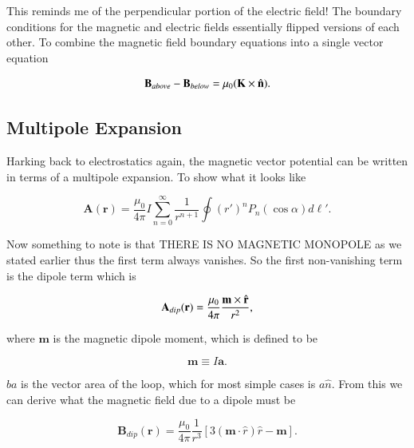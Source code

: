 \documentclass[preprint, review,12pt]{elsarticle}
\def\m{\frac{\mu_0}{4\pi}}
\def\x{\times}
\def\.{\cdot}
\def\b{\textbf}
\def\bell{\bm{\ell}}
\begin{document}
This reminds me of the perpendicular portion of the electric field! The boundary conditions for the magnetic and electric fields essentially flipped versions of each other. To combine the magnetic field boundary equations into a single vector equation

\begin{equation}
    \b{B}_{above} - \b{B}_{below}= \mu_0 (\b{K} \x \hat{\b n}).
\end{equation}

\subsection{Multipole Expansion}

Harking back to electrostatics again, the magnetic vector potential can be written in terms of a multipole expansion. To show what it looks like

\begin{equation}
    \b{A}(\b{r}) = \m I \sum_{n=0}^\infty \frac{1}{r^{n+1}}\oint (r')^n  P_n(\cos\alpha) d\bell '.
\end{equation}

Now something to note is that THERE IS NO MAGNETIC MONOPOLE as we stated earlier thus the first term always vanishes. So the first non-vanishing term is the dipole term which is

\begin{equation}
    \b{A}_{dip}(\b{r}) = \m \frac{\b{m} \x \hat{\b r}}{r^2},
\end{equation}

where $\b{m}$ is the magnetic dipole moment, which is defined to be

\begin{equation}
    \b{m} \equiv I\b{a}.
\end{equation}

$b{a}$ is the vector area of the loop, which for most simple cases is $a\hat{n}$. From this we can derive what the magnetic field due to a dipole must be

\begin{equation}
    \b{B}_{dip}(\b{r}) = \m \frac{1}{r^3}[3(\b{m} \. \hat{r})\hat{r} - \b{m}].
\end{equation}
\end{document}
